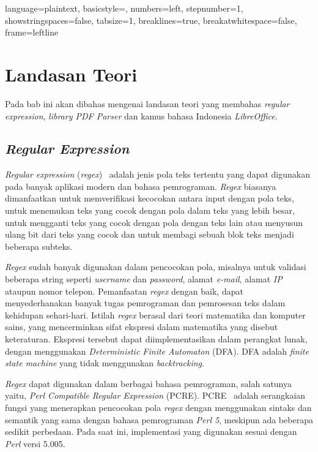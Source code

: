 
\lstset
{ 
    language=plaintext,
    basicstyle=\footnotesize,
    numbers=left,
    stepnumber=1,
    showstringspaces=false,
    tabsize=1,
    breaklines=true,
    breakatwhitespace=false,
    frame=leftline
}

\chapter{Landasan Teori}
\label{chap:teori}

Pada bab ini akan dibahas mengenai landasan teori yang membahas \textit{regular expression}, \textit{library PDF Parser} dan kamus bahasa Indonesia \textit{LibreOffice}.

\section{\textit{Regular Expression}}
\label{sec:regex} 
 
\textit{Regular expression} (\textit{regex})~\cite{jan:12:cookbook} adalah jenis pola teks tertentu yang dapat digunakan pada banyak aplikasi modern dan bahasa pemrograman. \textit{Regex} biasanya dimanfaatkan untuk memverifikasi kecocokan antara input dengan pola teks, untuk menemukan teks yang cocok dengan pola dalam teks yang lebih besar, untuk mengganti teks yang cocok dengan pola dengan teks lain atau menyusun ulang bit dari teks yang cocok dan untuk membagi sebuah blok teks menjadi beberapa subteks.

\textit{Regex} sudah banyak digunakan dalam pencocokan pola, misalnya untuk validasi beberapa string seperti \textit{username} dan \textit{password}, alamat \textit{e-mail}, alamat \textit{IP} ataupun nomor telepon. Pemanfaatan \textit{regex} dengan baik, dapat menyederhanakan banyak tugas pemrograman dan pemrosesan teks dalam kehidupan sehari-hari. Istilah \textit{regex} berasal dari teori matematika dan komputer sains, yang mencerminkan sifat ekspresi dalam matematika yang disebut keteraturan. Ekspresi tersebut dapat diimplementasikan dalam perangkat lunak, dengan menggunakan \textit{Deterministic Finite Automaton} (DFA). DFA adalah \textit{finite state machine} yang tidak menggunakan \textit{backtracking}.

\textit{Regex} dapat digunakan dalam berbagai bahasa pemrograman, salah satunya yaitu, \textit{Perl Compatible Regular Expression} (PCRE). PCRE~\cite{pcre} adalah serangkaian fungsi yang menerapkan pencocokan pola \textit{regex} dengan menggunakan sintaks dan semantik yang sama dengan bahasa pemrograman \textit{Perl 5}, meskipun ada beberapa sedikit perbedaan. Pada saat ini, implementasi yang digunakan sesuai dengan \textit{Perl} versi 5.005.

